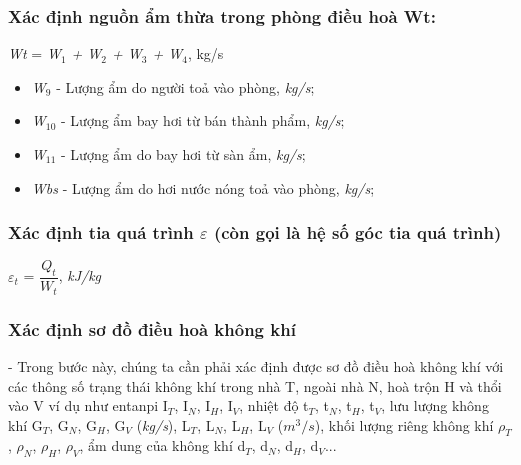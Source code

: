 \subsubsection{Xác định nguồn ẩm thừa trong phòng điều hoà W{\footnotesize t}:}

\begin{center}
	\textit{W{\footnotesize t}} = \textit{W$ _{1} $ + W$ _{2} $ + W$ _{3} $ + W$ _{4} $}, kg/s
\end{center}

\begin{itemize}[leftmargin = 3cm, label = $\ast$]
	\item \textit{W$ _{9} $} - Lượng ẩm do người toả vào phòng, \textit{kg/s};
	
	\item \textit{W$ _{10} $} - Lượng ẩm bay hơi từ bán thành phẩm, \textit{kg/s};

	\item \textit{W$ _{11} $} - Lượng ẩm do bay hơi từ sàn ẩm, \textit{kg/s};
	
	\item \textit{W{\footnotesize bs}} - Lượng ẩm do hơi nước nóng toả vào phòng, \textit{kg/s};	
\end{itemize}
	
\subsubsection{Xác định tia quá trình {\Large $\varepsilon$} (còn gọi là hệ số góc tia quá trình)}
\begin{center}
	{\Large $\varepsilon_{t}$} = $ \dfrac{Q_{t}}{W_{t}} $, \textit{kJ/kg}
\end{center}

\subsubsection{Xác định sơ đồ điều hoà không khí}
\hspace{1cm}- Trong bước này, chúng ta cần phải xác định được sơ đồ điều hoà không khí với các thông số trạng thái không khí trong nhà T, ngoài nhà N, hoà trộn H và thổi vào V ví dụ như entanpi I$_{T}$, I$_{N}$, I$_{H}$, I$_{V}$, nhiệt độ t$_{T}$, t$_{N}$, t$_{H}$, t$_{V}$, lưu lượng không khí G$_{T}$, G$_{N}$, G$_{H}$, G$_{V}$ (\textit{kg/s}), L$_{T}$, L$_{N}$, L$_{H}$, L$_{V}$ (\textit{$m^3/s$}), khối lượng riêng không khí $\rho_{T}$, $\rho_{N}$, $\rho_{H}$, $\rho_{V}$, ẩm dung của không khí d$_{T}$, d$_{N}$, d$_{H}$, d$_{V}$...

